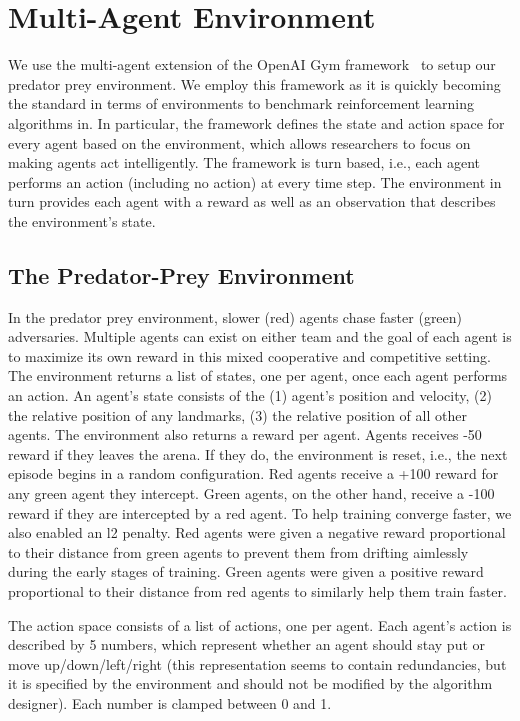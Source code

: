 
\section{Multi-Agent Environment}

We use the multi-agent extension of the OpenAI Gym framework~\cite{gym.openai16} to setup our predator prey environment. We employ this framework as it is quickly becoming the standard in terms of environments to benchmark reinforcement learning algorithms in. In particular, the framework defines the state and action space for every agent based on the environment, which allows researchers to focus on making agents act intelligently. The framework is turn based, i.e., each agent performs an action (including no action) at every time step. The environment in turn provides each agent with a reward as well as an observation that describes the environment's state.

\subsection{The Predator-Prey Environment}

In the predator prey environment, slower (red) agents chase faster (green) adversaries. Multiple agents can exist on either team and the goal of each agent is to maximize its own reward in this mixed cooperative and competitive setting. The environment returns a list of states, one per agent, once each agent performs an action. An agent's state consists of the (1) agent's position and velocity, (2) the relative position of any landmarks, (3) the relative position of all other agents. The environment also returns a reward per agent. Agents receives -50 reward if they leaves the arena. If they do, the environment is reset, i.e., the next episode begins in a random configuration. Red agents receive a +100 reward for any green agent they intercept. Green agents, on the other hand, receive a -100 reward if they are intercepted by a red agent. To help training converge faster, we also enabled an l2 penalty. Red agents were given a negative reward proportional to their distance from green agents to prevent them from drifting aimlessly during the early stages of training. Green agents were given a positive reward proportional to their distance from red agents to similarly help them train faster.

The action space consists of a list of actions, one per agent. Each agent's action is described by 5 numbers, which represent whether an agent should stay put or move up/down/left/right (this representation seems to contain redundancies, but it is specified by the environment and should not be modified by the algorithm designer). Each number is clamped between 0 and 1. 
